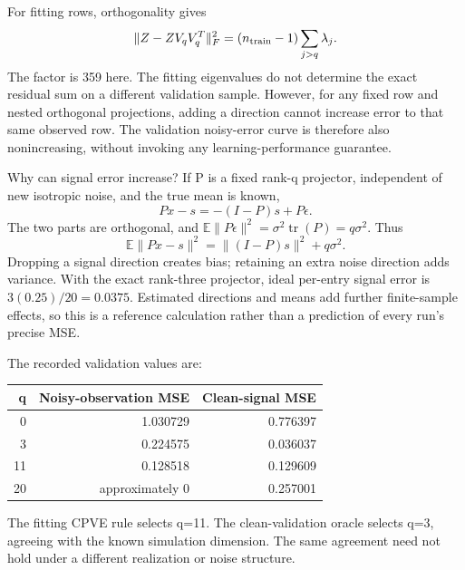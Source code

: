 For fitting rows, orthogonality gives
\[
\|Z-ZV_qV_q^T\|_F^2=(n_{\rm train}-1)\sum_{j>q}\lambda_j.
\]
The factor is 359 here. The fitting eigenvalues do not determine the exact residual sum on a different validation sample.
However, for any fixed row and nested orthogonal projections, adding a direction cannot increase error to that same observed row.
The validation noisy-error curve is therefore also nonincreasing, without invoking any learning-performance guarantee.

Why can signal error increase? If P is a fixed rank-q projector, independent of new isotropic noise, and the true mean is known,
\[
Px-s=-(I-P)s+P\epsilon.
\]
The two parts are orthogonal, and $\mathbb E\|P\epsilon\|^2=\sigma^2\operatorname{tr}(P)=q\sigma^2$.
Thus
\[\mathbb E\|Px-s\|^2=\|(I-P)s\|^2+q\sigma^2.\]
Dropping a signal direction creates bias; retaining an extra noise direction adds variance.
With the exact rank-three projector, ideal per-entry signal error is $3(0.25)/20=0.0375$.
Estimated directions and means add further finite-sample effects, so this is a reference calculation rather than a prediction of every run's precise MSE.

The recorded validation values are:
\begin{center}\begin{tabular}{rrr}\toprule
q&Noisy-observation MSE&Clean-signal MSE\\\midrule
0&1.030729&0.776397\\3&0.224575&0.036037\\
11&0.128518&0.129609\\20&approximately 0&0.257001\\\bottomrule\end{tabular}\end{center}
The fitting CPVE rule selects q=11. The clean-validation oracle selects q=3, agreeing with the known simulation dimension.
The same agreement need not hold under a different realization or noise structure.

